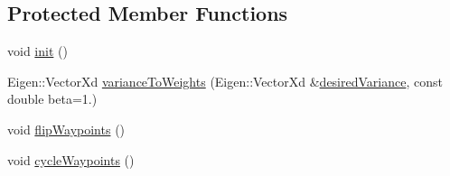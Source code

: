 \subsection*{Protected Member Functions}
\begin{DoxyCompactItemize}
\item 
void \hyperlink{classocra__recipes_1_1TrajectoryThread_a55a2e93d3706b500338c70d4e1c406ba}{init} ()
\item 
Eigen\+::\+Vector\+Xd \hyperlink{classocra__recipes_1_1TrajectoryThread_a80547ba585263055ad226a386ef18313}{variance\+To\+Weights} (Eigen\+::\+Vector\+Xd \&\hyperlink{classocra__recipes_1_1TrajectoryThread_a86a09c83fbbf2b7a22469a3476204b24}{desired\+Variance}, const double beta=1.)
\item 
void \hyperlink{classocra__recipes_1_1TrajectoryThread_aa7dfe52d95ee048e1e5fbf6ed7a820bd}{flip\+Waypoints} ()
\item 
void \hyperlink{classocra__recipes_1_1TrajectoryThread_a82672124920b0707e3b530d8826ce240}{cycle\+Waypoints} ()
\end{DoxyCompactItemize}
